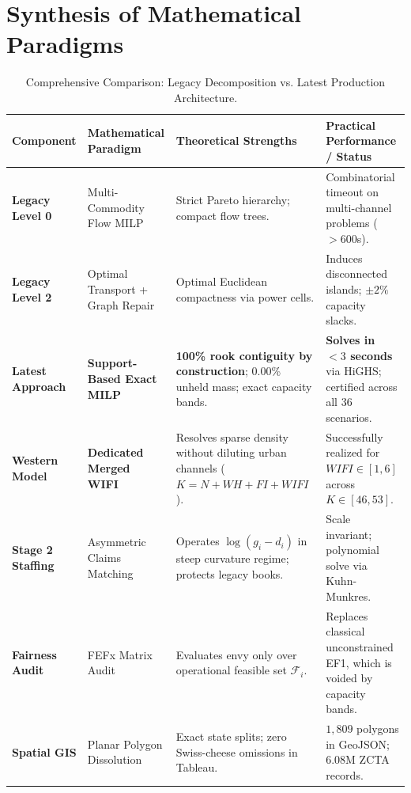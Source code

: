 \documentclass[11pt,a4paper]{article}
\theoremstyle{plain}
\theoremstyle{definition}
\begin{document}
\section{Synthesis of Mathematical Paradigms}

\begin{table}[h!]
\centering
\small
\begin{tabularx}{\textwidth}{l p{3.2cm} X X}
\toprule
\textbf{Component} & \textbf{Mathematical Paradigm} & \textbf{Theoretical Strengths} & \textbf{Practical Performance / Status} \\
\midrule
\textbf{Legacy Level 0} & Multi-Commodity Flow MILP & Strict Pareto hierarchy; compact flow trees. & Combinatorial timeout on multi-channel problems ($>600$s). \\
\addlinespace[0.5ex]
\textbf{Legacy Level 2} & Optimal Transport + Graph Repair & Optimal Euclidean compactness via power cells. & Induces disconnected islands; $\pm 2\%$ capacity slacks. \\
\addlinespace[0.5ex]
\textbf{Latest Approach} & \textbf{Support-Based Exact MILP} & \textbf{100\% rook contiguity by construction}; 0.00\% unheld mass; exact capacity bands. & \textbf{Solves in $<3$ seconds} via HiGHS; certified across all 36 scenarios. \\
\addlinespace[0.5ex]
\textbf{Western Model} & \textbf{Dedicated Merged WIFI} & Resolves sparse density without diluting urban channels ($K=N+WH+FI+WIFI$). & Successfully realized for $WIFI \in [1, 6]$ across $K \in [46, 53]$. \\
\addlinespace[0.5ex]
\textbf{Stage 2 Staffing} & Asymmetric Claims Matching & Operates $\log(g_i - d_i)$ in steep curvature regime; protects legacy books. & Scale invariant; polynomial solve via Kuhn-Munkres. \\
\addlinespace[0.5ex]
\textbf{Fairness Audit} & FEFx Matrix Audit & Evaluates envy only over operational feasible set $\mathcal{F}_i$. & Replaces classical unconstrained EF1, which is voided by capacity bands. \\
\addlinespace[0.5ex]
\textbf{Spatial GIS} & Planar Polygon Dissolution & Exact state splits; zero Swiss-cheese omissions in Tableau. & $1,809$ polygons in GeoJSON; $6.08\text{M}$ ZCTA records. \\
\bottomrule
\end{tabularx}
\caption{Comprehensive Comparison: Legacy Decomposition vs. Latest Production Architecture.}
\label{tab:matrix}
\end{table}
\end{document}
